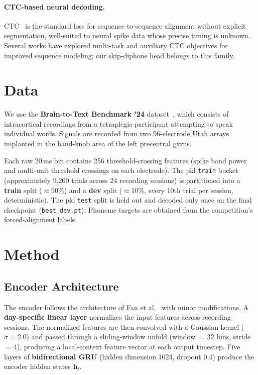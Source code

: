 \documentclass[10pt,twocolumn]{article}
\begin{document}
\paragraph{CTC-based neural decoding.}
CTC~\cite{graves2006ctc} is the standard loss for sequence-to-sequence
alignment without explicit segmentation, well-suited to neural spike data
whose precise timing is unknown.  Several works have explored multi-task
and auxiliary CTC objectives for improved sequence modeling; our
skip-diphone head belongs to this family.

\section{Data}

We use the \textbf{Brain-to-Text Benchmark '24} dataset~\cite{willett2023data},
which consists of intracortical recordings from a tetraplegic participant
attempting to speak individual words.  Signals are recorded from two
96-electrode Utah arrays implanted in the hand-knob area of the left
precentral gyrus.

Each raw 20\,ms bin contains 256 threshold-crossing features (spike band
power and multi-unit threshold crossings on each electrode).  The pkl
\texttt{train} bucket (approximately 9,200 trials across 24 recording
sessions) is partitioned into a \textbf{train} split ($\approx$90\%) and a
\textbf{dev} split ($\approx$10\%, every 10th trial per session,
deterministic).  The pkl \texttt{test} split is held out and decoded only
once on the final checkpoint (\texttt{best\_dev.pt}).  Phoneme targets are
obtained from the competition's forced-alignment labels.

\section{Method}

\subsection{Encoder Architecture}

The encoder follows the architecture of Fan et al.~\cite{neuralseqdecoder}
with minor modifications.  A \textbf{day-specific linear layer} normalizes
the input features across recording sessions.  The normalized features are
then convolved with a Gaussian kernel ($\sigma=2.0$) and passed through a
sliding-window unfold (window $= 32$ bins, stride $= 4$), producing a
local-context feature vector at each output timestep.  Five layers of
\textbf{bidirectional GRU} (hidden dimension 1024, dropout 0.4) produce
the encoder hidden states $\mathbf{h}_t$.
\end{document}
